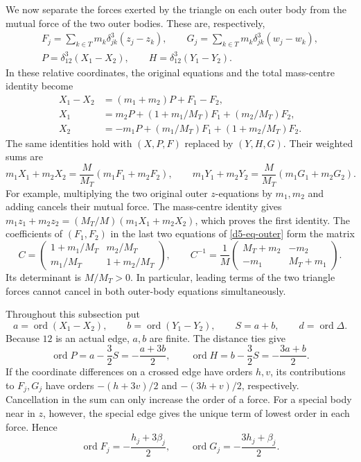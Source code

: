 \documentclass[11pt]{amsart}
\theoremstyle{definition}
\theoremstyle{remark}
\newcommand{\ord}{\operatorname{ord}}
\begin{document}
{We now separate the forces exerted by the triangle on each outer body from
the mutual force of the two outer bodies.  These are, respectively,
\[
 \begin{gathered}
 F_j=\sum_{k\in T}m_k\delta_{jk}^3(z_j-z_k),\qquad
 G_j=\sum_{k\in T}m_k\delta_{jk}^3(w_j-w_k),\\
 P=\delta_{12}^3(X_1-X_2),\qquad H=\delta_{12}^3(Y_1-Y_2).
 \end{gathered}
\]
In these relative coordinates, the original equations and the total
mass-centre identity become
\begin{equation}\label{d5-eq-outer}
 \begin{aligned}
 X_1-X_2&=(m_1+m_2)P+F_1-F_2,\\
 X_1&=m_2P+(1+m_1/M_T)F_1+(m_2/M_T)F_2,\\
 X_2&=-m_1P+(m_1/M_T)F_1+(1+m_2/M_T)F_2.
 \end{aligned}
\end{equation}
The same identities hold with $(X,P,F)$ replaced by $(Y,H,G)$.  Their weighted
sums are
\begin{equation}\label{d5-eq-centre}
 m_1X_1+m_2X_2=\frac M{M_T}(m_1F_1+m_2F_2),\qquad
 m_1Y_1+m_2Y_2=\frac M{M_T}(m_1G_1+m_2G_2).
\end{equation}
For example, multiplying the two original outer $z$-equations by $m_1,m_2$
and adding cancels their mutual force.  The mass-centre identity gives
$m_1z_1+m_2z_2=(M_T/M)(m_1X_1+m_2X_2)$, which proves the first identity.
The coefficients of $(F_1,F_2)$ in the last two equations of
\eqref{d5-eq-outer} form the matrix
\begin{equation}\label{d5-eq-force-matrix}
 C=\begin{pmatrix}1+m_1/M_T&m_2/M_T\\m_1/M_T&1+m_2/M_T\end{pmatrix},
 \qquad
 C^{-1}=\frac1M\begin{pmatrix}M_T+m_2&-m_2\\-m_1&M_T+m_1\end{pmatrix}.
\end{equation}
Its determinant is $M/M_T>0$.  In particular, leading terms of the two
triangle forces cannot cancel in both outer-body equations simultaneously.

Throughout this subsection put
\[
 a=\ord(X_1-X_2),\qquad b=\ord(Y_1-Y_2),\qquad S=a+b,
 \qquad d=\ord\Delta.
\]
Because $12$ is an actual edge, $a,b$ are finite.  The distance ties give
\begin{equation}\label{d5-eq-pair-orders}
 \ord P=a-\frac32S=-\frac{a+3b}{2},\qquad
 \ord H=b-\frac32S=-\frac{3a+b}{2}.
\end{equation}
If the coordinate differences on a crossed edge have orders $h,v$, its
contributions to $F_j,G_j$ have orders $-(h+3v)/2$ and $-(3h+v)/2$,
respectively.  Cancellation in the sum can only increase the order of a
force.  For a special body near in $z$, however, the special edge gives
the unique term of lowest order in each force.  Hence
\begin{equation}\label{d5-eq-special-force}
 \ord F_j=-\frac{h_j+3\beta_j}{2},\qquad
 \ord G_j=-\frac{3h_j+\beta_j}{2}.
\end{equation}

}
\end{document}
